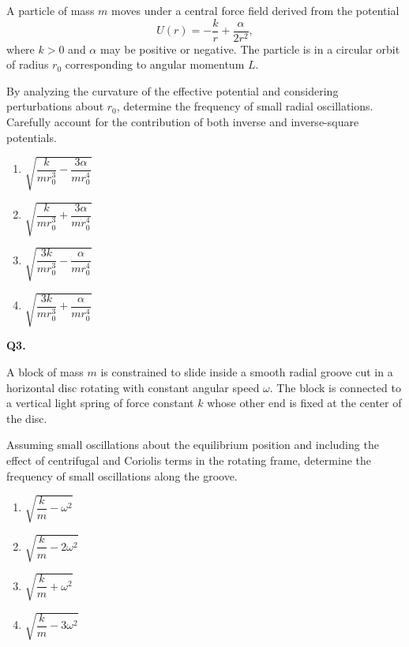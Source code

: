 \documentclass[12pt]{article}
\begin{document}
A particle of mass $m$ moves under a central force field derived from the potential  
\[
U(r)= -\frac{k}{r} + \frac{\alpha}{2r^2},
\]
where $k>0$ and $\alpha$ may be positive or negative. The particle is in a circular orbit of radius $r_0$ corresponding to angular momentum $L$.

By analyzing the curvature of the effective potential and considering perturbations about $r_0$, determine the frequency of small radial oscillations. Carefully account for the contribution of both inverse and inverse-square potentials.

\begin{enumerate}
\item[(A)] $\sqrt{\dfrac{k}{mr_0^3}-\dfrac{3\alpha}{mr_0^4}}$
\item[(B)] $\sqrt{\dfrac{k}{mr_0^3}+\dfrac{3\alpha}{mr_0^4}}$
\item[(C)] $\sqrt{\dfrac{3k}{mr_0^3}-\dfrac{\alpha}{mr_0^4}}$
\item[(D)] $\sqrt{\dfrac{3k}{mr_0^3}+\dfrac{\alpha}{mr_0^4}}$
\end{enumerate}

\bigskip

\textbf{Q3.}

A block of mass $m$ is constrained to slide inside a smooth radial groove cut in a horizontal disc rotating with constant angular speed $\omega$. The block is connected to a vertical light spring of force constant $k$ whose other end is fixed at the center of the disc.

Assuming small oscillations about the equilibrium position and including the effect of centrifugal and Coriolis terms in the rotating frame, determine the frequency of small oscillations along the groove.

\begin{center}
\end{center}

\begin{enumerate}
\item[(A)] $\sqrt{\dfrac{k}{m}-\omega^2}$
\item[(B)] $\sqrt{\dfrac{k}{m}-2\omega^2}$
\item[(C)] $\sqrt{\dfrac{k}{m}+\omega^2}$
\item[(D)] $\sqrt{\dfrac{k}{m}-3\omega^2}$
\end{enumerate}
\end{document}
